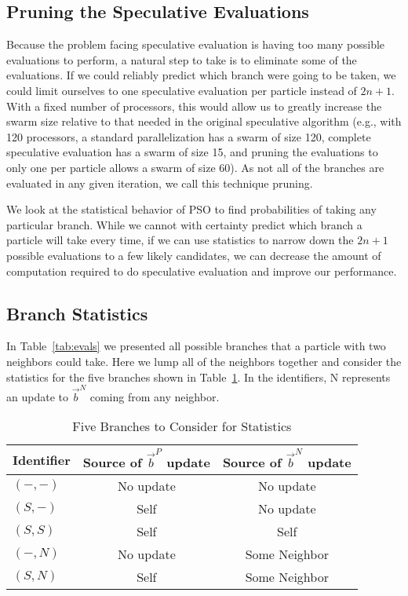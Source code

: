 \documentclass[smallcondensed]{svjour3}
\providecommand{\pers}{\ensuremath{P}}
\providecommand{\neigh}{\ensuremath{N}}
\providecommand{\nbest}{\ensuremath{\Vec{b}^\neigh}}
\providecommand{\pbest}{\ensuremath{\Vec{b}^\pers}}
\providecommand{\casexn}{\ensuremath{(S,-)}}
\providecommand{\casexx}{\ensuremath{(S,S)}}
\providecommand{\casepn}{\ensuremath{(-,-)}}
\providecommand{\casepN}{\ensuremath{(-,N)}}
\providecommand{\casexN}{\ensuremath{(S,N)}}
\begin{document}
\subsection{Pruning the Speculative Evaluations}
\label{sec:pruning}

Because the problem facing speculative evaluation is having too many possible
evaluations to perform, a natural step to take is to eliminate some of the
evaluations.  If we could reliably predict which branch were going to be taken,
we could limit ourselves to one speculative evaluation per particle instead of
$2n+1$.  With a fixed number of processors, this would allow us to greatly
increase the swarm size relative to that needed in the original speculative
algorithm (e.g., with 120 processors, a standard parallelization has a swarm of
size 120, complete speculative evaluation has a swarm of size 15, and pruning
the evaluations to only one per particle allows a swarm of size 60).  As not
all of the branches are evaluated in any given iteration, we call this
technique pruning.

We look at the statistical behavior of PSO to find probabilities of taking any
particular branch.  While we cannot with certainty predict which branch a
particle will take every time, if we can use statistics to narrow down the
$2n+1$ possible evaluations to a few likely candidates, we can decrease the
amount of computation required to do speculative evaluation and improve our
performance.

\subsection{Branch Statistics}
\label{sec:statistics}

In Table~\ref{tab:evals} we presented all possible branches that a particle
with two neighbors could take.  Here we lump all of the neighbors together and
consider the statistics for the five branches shown in
Table~\ref{tab:branches}.  In the identifiers, N represents an update to
$\nbest$ coming from any neighbor.

\begin{table}[ht]
  \caption{Five Branches to Consider for Statistics}
  \label{tab:branches}
  \centering
  \begin{tabular}{lcc}
	Identifier&Source of $\pbest$ update&Source of $\nbest$ update\\
	\hline
	\hline
	$\casepn$&No update&No update\\
	\hline
	$\casexn$&Self&No update\\
	\hline
	$\casexx$&Self&Self\\
	\hline
	$\casepN$&No update&Some Neighbor\\
	\hline
	$\casexN$&Self&Some Neighbor\\
	\hline
  \end{tabular}
\end{table}
\end{document}
